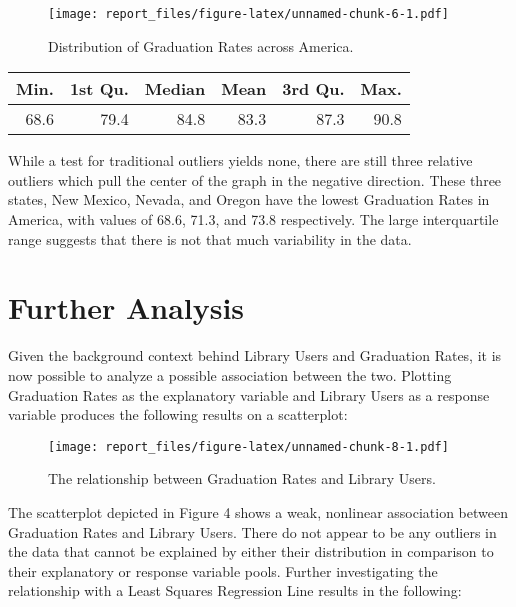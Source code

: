 \documentclass[12pt,]{article}
\begin{document}
\vspace{20pt}

\begin{figure}[htbp]
\centering
\texttt{[image: report\_files/figure-latex/unnamed-chunk-6-1.pdf]}
\caption{Distribution of Graduation Rates across America.}
\end{figure}

\begin{longtable}[]{@{}rrrrrr@{}}
\toprule
Min. & 1st Qu. & Median & Mean & 3rd Qu. & Max.\tabularnewline
\midrule
\endhead
68.6 & 79.4 & 84.8 & 83.3 & 87.3 & 90.8\tabularnewline
\bottomrule
\end{longtable}

\vspace{0pt}

While a test for traditional outliers yields none, there are still three
relative outliers which pull the center of the graph in the negative
direction. These three states, New Mexico, Nevada, and Oregon have the
lowest Graduation Rates in America, with values of 68.6, 71.3, and 73.8
respectively. The large interquartile range suggests that there is not
that much variability in the data.

\newpage

\section{Further Analysis}\label{further-analysis}

Given the background context behind Library Users and Graduation Rates,
it is now possible to analyze a possible association between the two.
Plotting Graduation Rates as the explanatory variable and Library Users
as a response variable produces the following results on a scatterplot:

\vspace{20pt}

\begin{figure}[htbp]
\centering
\texttt{[image: report\_files/figure-latex/unnamed-chunk-8-1.pdf]}
\caption{The relationship between Graduation Rates and Library Users.}
\end{figure}

\vspace{0pt}

\newpage

The scatterplot depicted in Figure 4 shows a weak, nonlinear association
between Graduation Rates and Library Users. There do not appear to be
any outliers in the data that cannot be explained by either their
distribution in comparison to their explanatory or response variable
pools. Further investigating the relationship with a Least Squares
Regression Line results in the following:
\end{document}
